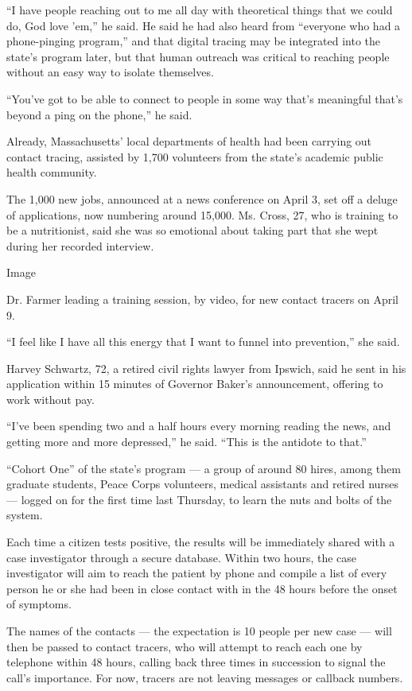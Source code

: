 ``I have people reaching out to me all day with theoretical things that
we could do, God love 'em,'' he said. He said he had also heard from
``everyone who had a phone-pinging program,'' and that digital tracing
may be integrated into the state's program later, but that human
outreach was critical to reaching people without an easy way to isolate
themselves.

``You've got to be able to connect to people in some way that's
meaningful that's beyond a ping on the phone,'' he said.

Already, Massachusetts' local departments of health had been carrying
out contact tracing, assisted by 1,700 volunteers from the state's
academic public health community.

The 1,000 new jobs, announced at a news conference on April 3, set off a
deluge of applications, now numbering around 15,000. Ms. Cross, 27, who
is training to be a nutritionist, said she was so emotional about taking
part that she wept during her recorded interview.

Image

Dr. Farmer leading a training session, by video, for new contact tracers
on April 9.

``I feel like I have all this energy that I want to funnel into
prevention,'' she said.

Harvey Schwartz, 72, a retired civil rights lawyer from Ipswich, said he
sent in his application within 15 minutes of Governor Baker's
announcement, offering to work without pay.

``I've been spending two and a half hours every morning reading the
news, and getting more and more depressed,'' he said. ``This is the
antidote to that.''

``Cohort One'' of the state's program --- a group of around 80 hires,
among them graduate students, Peace Corps volunteers, medical assistants
and retired nurses --- logged on for the first time last Thursday, to
learn the nuts and bolts of the system.

Each time a citizen tests positive, the results will be immediately
shared with a case investigator through a secure database. Within two
hours, the case investigator will aim to reach the patient by phone and
compile a list of every person he or she had been in close contact with
in the 48 hours before the onset of symptoms.

The names of the contacts --- the expectation is 10 people per new case
--- will then be passed to contact tracers, who will attempt to reach
each one by telephone within 48 hours, calling back three times in
succession to signal the call's importance. For now, tracers are not
leaving messages or callback numbers.


